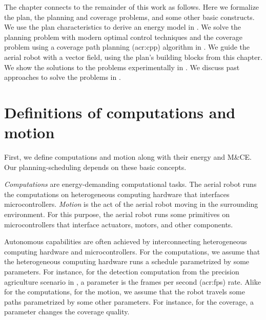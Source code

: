 The chapter connects to the remainder of this work as follows. Here we formalize the plan, the planning and coverage problems, and some other basic constructs. We use the plan characteristics to derive an energy model in . We solve the planning problem with modern optimal control techniques and the coverage problem using a coverage path planning (\Gls{acr:cpp}) algorithm in . We guide the aerial robot with a vector field, using the plan's building blocks from this chapter. We show the solutions to the problems experimentally in . We discuss past approaches to solve the problems in .%


\section{Definitions of computations and motion}
\label{sec:definitions}

First, we define computations and motion along with their energy and M\&CE. Our planning-scheduling depends on these basic concepts.

\begin{defn}
  \label{def:comps}
  \emph{Computations} are energy-demanding computational tasks. The aerial robot runs the computations on heterogeneous computing hardware that interfaces microcontrollers.
  \emph{Motion} is the act of the aerial robot moving in the surrounding environment. For this purpose, the aerial robot runs some primitives on microcontrollers that interface actuators, motors, and other components.
\end{defn}

Autonomous capabilities are often achieved by interconnecting heterogeneous computing hardware and microcontrollers. For the computations, we assume that the heterogeneous computing hardware runs a schedule parametrized by some parameters. For instance, for the detection computation from the precision agriculture scenario in , a parameter is the frames per second (\Gls{acr:fps}) rate. Alike for the computations, for the motion, we assume that the robot travels some paths parametrized by some other parameters. For instance, for the coverage, a parameter changes the coverage quality.

